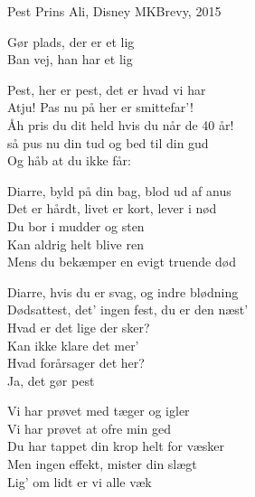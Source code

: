 \begin{song}{Pest}
  {} %
  {Prins Ali, Disney} %
  {} %
  {MKBrevy, 2015} %
  {\NotCCLIed} %

  \begin{SBSection*}
    Gør plads, der er et lig\\
    Ban vej, han har et lig
  \end{SBSection*}

  \begin{SBVerse}
    Pest, her er pest, det er hvad vi har\\
    Atju! Pas nu på her er smittefar'!\\
    Åh pris du dit held hvis du når de 40 år!\\
    så pus nu din tud og bed til din gud\\
    Og håb at du ikke får:
  \end{SBVerse}

  \begin{SBChorus}
    Diarre, byld på din bag, blod ud af anus\\
    Det er hårdt, livet er kort, lever i nød\\
    Du bor i mudder og sten\\
    Kan aldrig helt blive ren\\
    Mens du bekæmper en evigt truende død
  \end{SBChorus}

  \begin{SBChorus}
    Diarre, hvis du er svag, og indre blødning\\
    Dødsattest, det' ingen fest, du er den næst'\\
    Hvad er det lige der sker?\\
    Kan ikke klare det mer'\\
    Hvad forårsager det her?\\
    Ja, det gør pest
  \end{SBChorus}

  \begin{SBVerse}
    Vi har prøvet med tæger og igler\\
    Vi har prøvet at ofre min ged\\
    Du har tappet din krop helt for væsker\\
    Men ingen effekt, mister din slægt\\
    Lig' om lidt er vi alle væk
  \end{SBVerse}


\end{song}
